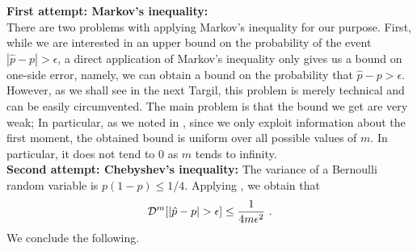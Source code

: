 \documentclass[11pt]{article}
\newcommand{\bN}{\mathbb{N}\,}
\begin{document}
\noindent \textbf{First attempt: Markov's inequality: }\\
There are two problems with applying Markov's inequality for our purpose. First, while we are interested in an upper bound on the probability of the event $|\hat{p}-p| > \epsilon$, a direct application of Markov's inequality only gives us a bound on one-side error, namely, we can obtain a bound on the probability that $\hat{p} - p > \epsilon$. However, as we shall see in the next Targil, this problem is merely technical and can be easily circumvented. The main problem is that the bound we get are very weak; In particular, as we noted in , since we only exploit information about the first moment, the obtained bound is uniform over all possible values of $m$. In particular, it does not tend to $0$ as $m$ tends to infinity.\\

\noindent \textbf{Second attempt: Chebyshev's inequality: }
The variance of a Bernoulli random variable is $p(1-p) \le 1/4$. Applying , we obtain that 
\[
\mathcal{D}^m [|\hat{p}-p| > \epsilon] \le \frac{1}{4m \epsilon ^2}~.
\]  
We conclude the following.

\end{document}
